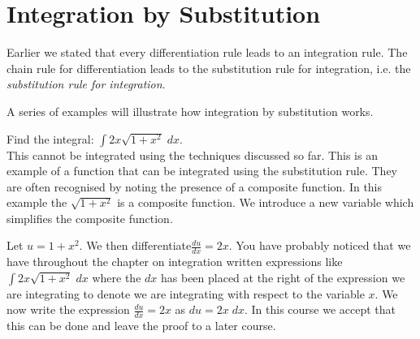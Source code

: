 \section{Integration by Substitution}
Earlier we stated that every differentiation rule leads to an integration rule. The chain rule for differentiation leads to the substitution rule for integration, i.e. the \emph{substitution rule for integration}. 

A series of examples will illustrate how integration by substitution works.

\example Find the integral: $\int 2 x \sqrt{1 +x^{2}}\; d x$.\medskip\\
\solution This cannot be integrated using the techniques discussed so far. This is an example of a function that can be integrated using the substitution rule. They are often recognised by noting the presence of a composite function. In this example the $\sqrt{1 +x^{2}}$ is a composite function. We introduce a new variable which simplifies the composite function.

Let $u =1 +x^{2}$. We then differentiate$\frac{d u}{d x} =2 x$. You have probably noticed that we have throughout the chapter on integration written expressions like $\int 2 x \sqrt{1 +x^{2}}\; d x$ where the $d x$ has been placed at the right of the expression we are integrating to denote we are integrating with respect to the variable $x$. We now write the expression $\frac{d u}{d x} =2 x$ as $d u =2 x\; d x$. In this course we accept that this can be done and leave the proof to a later course.

